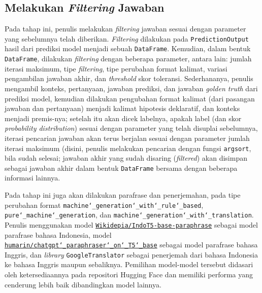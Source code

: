 \subsection{Melakukan \emph{Filtering} Jawaban}
\label{4.4.10}
Pada tahap ini, penulis melakukan \emph{filtering} jawaban sesuai dengan parameter yang sebelumnya telah diberikan. \emph{Filtering} dilakukan pada \texttt{PredictionOutput} hasil dari prediksi model menjadi sebuah \texttt{DataFrame}. Kemudian, dalam bentuk \texttt{DataFrame}, dilakukan \emph{filtering} dengan beberapa parameter, antara lain: jumlah iterasi maksimum, tipe \emph{filtering}, tipe perubahan format kalimat, variasi pengambilan jawaban akhir, dan \emph{threshold} skor toleransi. Sederhananya, penulis mengambil konteks, pertanyaan, jawaban prediksi, dan jawaban \emph{golden truth} dari prediksi model, kemudian dilakukan pengubahan format kalimat (dari pasangan jawaban dan pertanyaan) menjadi kalimat hipotesis deklaratif, dan konteks menjadi premis-nya; setelah itu akan dicek labelnya, apakah label (dan skor \emph{probability distribution}) sesuai dengan parameter yang telah disuplai sebelumnya, iterasi pencarian jawaban akan terus berjalan sesuai dengan parameter jumlah iterasi maksimum (disini, penulis melakukan pencarian dengan fungsi \texttt{argsort}, bila sudah selesai; jawaban akhir yang sudah disaring (\emph{filtered}) akan disimpan sebagai jawaban akhir dalam bentuk \texttt{DataFrame} bersama dengan beberapa informasi lainnya.

Pada tahap ini juga akan dilakukan parafrase dan penerjemahan, pada tipe perubahan format \texttt{machine\char`_generation\char`_with\char`_rule\char`_based}, \texttt{pure\char`_machine\char`_generation}, dan \texttt{machine\char`_generation\char`_with\char`_translation}. Penulis menggunakan model \href{https://huggingface.co/Wikidepia/IndoT5-base-paraphrase}{\texttt{Wikidepia/IndoT5-base-paraphrase}} sebagai model parafrase bahasa Indonesia, model \href{https://huggingface.co/humarin/chatgpt_paraphraser_on_T5_base}{\texttt{humarin/chatgpt\char`_paraphraser\char`_on\char`_T5\char`_base}} sebagai model parafrase bahasa Inggris, dan \emph{library} \texttt{GoogleTranslator} sebagai penerjemah dari bahasa Indonesia ke bahasa Inggris maupun sebaliknya. Pemilihan model-model tersebut didasari oleh ketersediaannya pada repositori Hugging Face dan memiliki performa yang cenderung lebih baik dibandingkan model lainnya.

